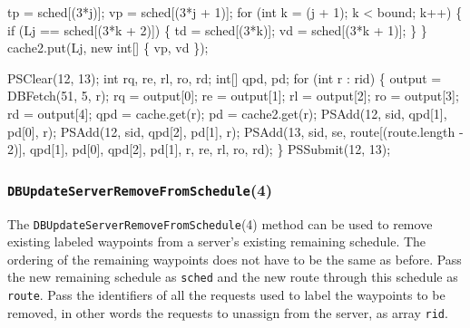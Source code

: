 \documentclass{article}
\def\nwendcode{\endtrivlist \endgroup}
\let\nwdocspar=\par
\theoremstyle{definition}
\begin{document}
\nwenddocs{}\endmoddef{}
tp = sched[(3*j)];
vp = sched[(3*j + 1)];
for (int k = (j + 1); k < bound; k++) \{
  if (Lj == sched[(3*k + 2)]) \{
    td = sched[(3*k)];
    vd = sched[(3*k + 1)];
  \}
\}
cache2.put(Lj, new int[] \{ vp, vd \});
\nwendcode{}\nwdocspar
\nwenddocs{}\endmoddef{}
PSClear(12, 13);
int rq, re, rl, ro, rd;
int[] qpd, pd;
for (int r : rid) \{
  output = DBFetch(51, 5, r);
  rq = output[0];
  re = output[1];
  rl = output[2];
  ro = output[3];
  rd = output[4];
  qpd = cache.get(r);
  pd = cache2.get(r);
  PSAdd(12, sid, qpd[1], pd[0], r);
  PSAdd(12, sid, qpd[2], pd[1], r);
  PSAdd(13, sid, se, route[(route.length - 2)], qpd[1], pd[0], qpd[2], pd[1],
        r, re, rl, ro, rd);
\}
PSSubmit(12, 13);
\nwendcode{}\nwdocspar

\subsubsection{{\tt{}\protect{}DBUpdateServerRemoveFromSchedule}(4)}
The {\tt{}\protect{}DBUpdateServerRemoveFromSchedule}(4) method can be used to remove
existing labeled waypoints from a server's existing remaining schedule. The
ordering of the remaining waypoints does not have to be the same as before.
Pass the new remaining schedule as {\tt{}sched} and the new route through this
schedule as {\tt{}route}. Pass the identifiers of all the requests used to label
the waypoints to be removed, in other words the requests to unassign from the
server, as array {\tt{}rid}.
\end{document}
